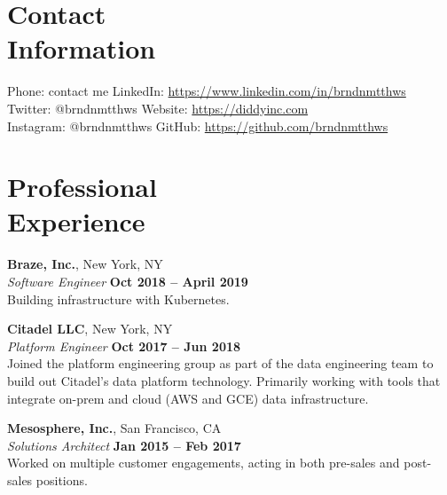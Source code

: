\documentclass[margin,line]{resume}
\begin{document}
\begin{resume}
    \section{\mysidestyle Contact\\Information}

    Phone: contact me                  \hfill LinkedIn: \url{https://www.linkedin.com/in/brndnmtthws} \\
    \noindent Twitter: @brndnmtthws    \hfill Website: \url{https://diddyinc.com} \\
    \noindent Instagram: @brndnmtthws  \hfill GitHub: \url{https://github.com/brndnmtthws}\vspace{0mm}\\\vspace{-4.5mm}

    \section{\mysidestyle Professional\\Experience}

    \textbf{Braze, Inc.}, New York, NY \vspace{2mm}\\\vspace{1mm}%
    \textsl{Software Engineer} \hfill \textbf{Oct 2018 -- April 2019}\\
    Building infrastructure with Kubernetes.

    \textbf{Citadel LLC}, New York, NY \vspace{2mm}\\\vspace{1mm}%
    \textsl{Platform Engineer} \hfill \textbf{Oct 2017 -- Jun 2018}\\
    Joined the platform engineering group as part of the data engineering
    team to build out Citadel's data platform technology. Primarily working
    with tools that integrate on-prem and cloud (AWS and GCE) data
    infrastructure.

    \textbf{Mesosphere, Inc.}, San Francisco, CA \vspace{2mm}\\\vspace{1mm}%
    \textsl{Solutions Architect} \hfill \textbf{Jan 2015 -- Feb 2017}\\
    Worked on multiple customer engagements, acting in both pre-sales and
    post-sales positions.


\end{resume}
\end{document}
